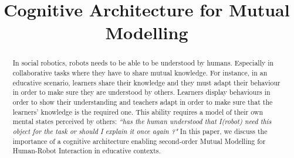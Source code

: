 \documentclass[conference]{IEEEtran}
\begin{document}
\title{Cognitive Architecture for Mutual Modelling}


\author{
}



\maketitle

\begin{abstract}
In social robotics, robots needs to be able to be understood by humans.
Especially in collaborative tasks where they have to share mutual knowledge. 
For instance, in an educative scenario, learners share their knowledge and they must adapt their behaviour in order to make sure they are understood by others. 
Learners display behaviours in order to show their understanding and teachers adapt in order to make sure that the learners' knowledge is the required one. 
This ability requires a model of their own mental states perceived by others: \textit{``has the human understood that I(robot) need this object for the task or should I explain it once again ?"}  
In this paper, we discuss the importance of a cognitive architecture enabling second-order Mutual Modelling for Human-Robot Interaction in educative contexts.


\end{abstract}





%
\IEEEpeerreviewmaketitle
\end{document}
